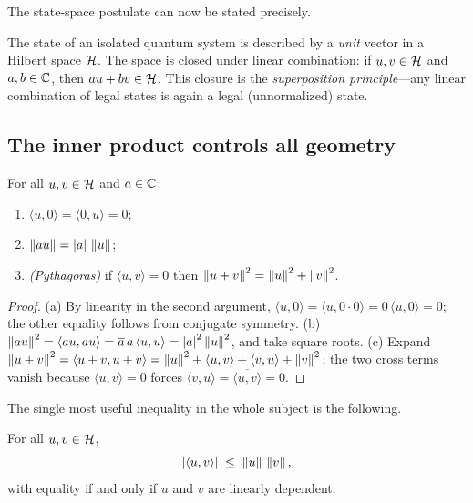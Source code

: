 The state-space postulate can now be stated precisely.

\begin{remark}
The state of an isolated quantum system is described by a \emph{unit} vector in a
Hilbert space $\mathcal{H}$. The space is closed under linear combination: if
$u,v\in\mathcal{H}$ and $a,b\in\mathbb{C}$, then $a u+b v\in\mathcal{H}$. This closure is the
\emph{superposition principle}---any linear combination of legal states is again a
legal (unnormalized) state.
\end{remark}

\subsection{The inner product controls all geometry}

\begin{proposition}\label{prop:lec01-elem}
For all $u,v\in\mathcal{H}$ and $a\in\mathbb{C}$:
\begin{enumerate}[label=(\alph*)]
  \item $\langle u,0\rangle=\langle 0,u\rangle=0$;
  \item $\left\lVert a u \right\rVert=\left\lvert a \right\rvert\,\left\lVert u \right\rVert$;
  \item \emph{(Pythagoras)} if $\langle u,v\rangle=0$ then
        $\left\lVert u+v \right\rVert^{2}=\left\lVert u \right\rVert^{2}+\left\lVert v \right\rVert^{2}$.
\end{enumerate}
\end{proposition}

\begin{proof}
(a) By linearity in the second argument, $\langle u,0\rangle=\langle u,0\cdot 0\rangle=0\,\langle u,0\rangle=0$;
the other equality follows from conjugate symmetry.
(b) $\left\lVert a u \right\rVert^{2}=\langle a u,a u\rangle=\overline{a}\,a\,\langle u,u\rangle=\left\lvert a \right\rvert^{2}\left\lVert u \right\rVert^{2}$,
and take square roots.
(c) Expand $\left\lVert u+v \right\rVert^{2}=\langle u+v,u+v\rangle=\left\lVert u \right\rVert^{2}+\langle u,v\rangle+\langle v,u\rangle+\left\lVert v \right\rVert^{2}$;
the two cross terms vanish because $\langle u,v\rangle=0$ forces
$\langle v,u\rangle=\overline{\langle u,v\rangle}=0$.
\end{proof}

The single most useful inequality in the whole subject is the following.

\begin{theorem}\label{thm:lec01-cs}
For all $u,v\in\mathcal{H}$,
\begin{equation}
  \left\lvert \langle u,v\rangle \right\rvert\;\le\;\left\lVert u \right\rVert\,\left\lVert v \right\rVert,
\end{equation}
with equality if and only if $u$ and $v$ are linearly dependent.
\end{theorem}

